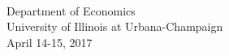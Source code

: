 \documentclass[11pt]{amsart}
\begin{document}
\vspace{4mm}
\begin{center}

\vspace{8mm}
\huge{{\color{blue}{Sixth Annual Boneyard Econometrics Conference} }}\\
\vspace{2mm}
\large{Department of Economics \\ University of  Illinois at Urbana-Champaign}\\
\vspace{4mm}
\large{April 14-15, 2017}
\vspace{2mm}

\end{center}

\vspace{8mm}
\end{document}

